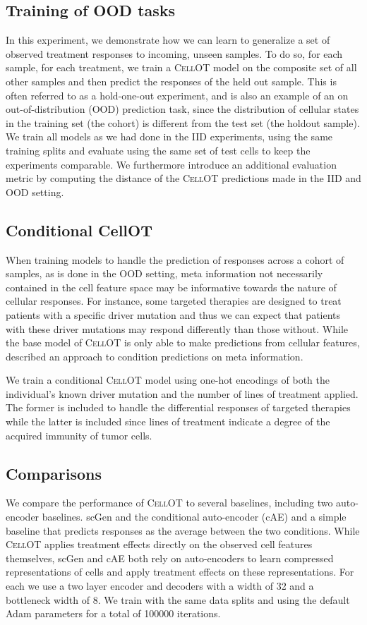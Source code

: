 \subsection{Training of OOD tasks}
In this experiment, we demonstrate how we can learn to generalize a set of observed treatment responses to incoming, unseen samples. To do so,  for each sample, for each treatment, we train a \textsc{CellOT} model on the composite set of all other samples and then predict the responses of the held out sample. This is often referred to as a hold-one-out experiment, and is also an example of an on out-of-distribution (OOD) prediction task, since the distribution of cellular states in the training set (the cohort) is different from the test set (the holdout sample). We train all models as we had done in the IID experiments, using the same training splits and evaluate using the same set of test cells to keep the experiments comparable.  We furthermore introduce an additional evaluation metric by computing the distance of the \textsc{CellOT} predictions made in the IID and OOD setting.

\subsection{Conditional CellOT}
When training models to handle the prediction of responses across a cohort of samples, as is done in the OOD setting, meta information not necessarily contained in the cell feature space may be informative towards the nature of cellular responses. For instance, some targeted therapies are designed to treat patients with a specific driver mutation and thus we can expect that patients with these driver mutations may respond differently than those without. While the base model of \textsc{CellOT} is only able to make predictions from cellular features, \cite{bunne2022} described an approach to condition predictions on meta information.

We train a conditional \textsc{CellOT} model using one-hot encodings of both the individual’s known driver mutation and the number of lines of treatment applied. The former is included to handle the differential responses of targeted therapies while the latter is included since lines of treatment indicate a degree of the acquired immunity of tumor cells.

\subsection{Comparisons}
We compare the performance of \textsc{CellOT} to several baselines, including two auto-encoder baselines. scGen \cite{lotfollahi2019} and the conditional auto-encoder (cAE) \cite{lopez2018} and a simple baseline that predicts responses as the average between the two conditions. While \textsc{CellOT} applies treatment effects directly on the observed cell features themselves, scGen and cAE both rely on auto-encoders to learn compressed representations of cells and apply treatment effects on these representations. For each we use a two layer encoder and decoders with a width of 32 and a bottleneck width of 8. We train with the same data splits and using the default Adam parameters for a total of 100000 iterations.
